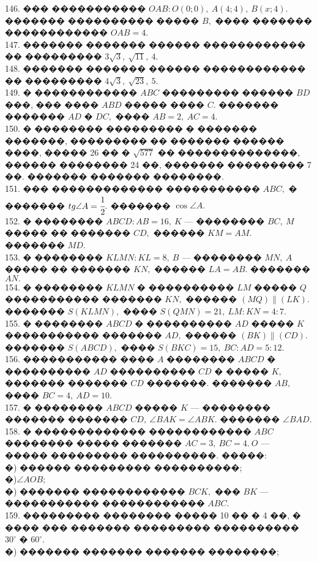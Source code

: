 \documentclass[12pt]{article}
\begin{document}
146. ��� ����������� $OAB: O(0;0),\ A(4;4),\ B(x;4).$ ������� ���������� ����� $B,$ ���� ������� ������������ $OAB=4.$\\
147. ������� ������� ������ ������������ �� ��������� $3\sqrt{3},\ \sqrt{11},\ 4.$\\
148. ������� ������� ������ ������������ �� ��������� $4\sqrt{3},\ \sqrt{23},\ 5.$\\
149. � ������������ $ABC$ ��������� ������ $BD$ ���, ��� ���� $ABD$ ����� ���� $C.$ ������� ������� $AD$ � $DC,$ ���� $AB=2,\ AC=4.$\\
150. � �������� ��������� � ������� �������, ��������� �� ������� ������ ����, ����� 26 �� � $\sqrt{577}$ �� ��������������, ������ �������� 24 ��, ������� ��������� 7 ��. ������� ������� ��������.\\
151. ��� ������������� ����������� $ABC,$ � ������� $tg\angle A=\cfrac{1}{2}.$ ������� $\cos \angle A.$\\
152. � �������� $ABCD: AB=16,\ K$ --- �������� $BC,\ M$ ����� �� ������� $CD,$ ������ $KM=AM.$ ������� $MD.$\\
153. � �������� $KLMN: KL=8,\ B$ --- �������� $MN,\ A$ ����� �� ������� $KN,$ ������ $LA=AB.$ ������� $AN.$\\
154. � �������� $KLMN$ � ���������� $LM$ ����� $Q$ ����������� ������� $KN,$ ������ $(MQ)\parallel(LK).$ ������� $S(KLMN),$ ���� $S(QMN)=21,\ LM:KN=4:7.$\\
155. � �������� $ABCD$ � ���������� $AD$ ����� $K$ ����������� ������� $AD,$ ������ $(BK)\parallel(CD).$ ������� $S(ABCD),$ ���� $S(BKC)=15,\ BC:AD=5:12.$\\
156. ����������� ���� $A$ �������� $ABCD$ � ���������� $AD$ ���������� $CD$ � ����� $K,$ ������� ������� $CD$ �������. ������� $AB,$ ���� $BC=4,\ AD=10.$\\
157. � �������� $ABCD$ ����� $K$ --- �������� ������� ������� $CD,\ \angle BAK=\angle ABK.$ ������� $\angle BAD.$\\
158. � ������������� ������������ $ABC$ �������� ����� ������� $AC=3,\ BC=4.\ O$ --- ����� ��������� ����������. �����:\\
�) ������ ��������� ����������;\\
�)$\angle AOB;$\\
�) ������� ������������ $BCK,$ ��� $BK$ --- ����������� ������������ $ABC.$\\
159. ��������� �������� ����� 10 �� � 4 ��, � ���� ��� ������� ��������� ���������� $30^\circ$ � $60^\circ.$\\
�) ������� ������� ������� ��������;\\
\end{document}
